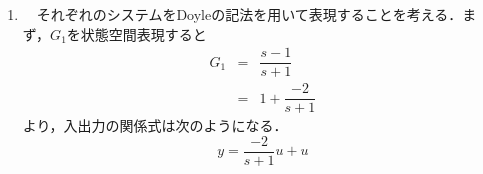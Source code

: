 \documentclass[a4paper,11pt]{jarticle}
\begin{document}
\begin{enumerate}
\begin{eqnarray*}
\begin{array}{c}
						       - \frac{1}{b} \\
						      \end{array}
						      \right] \nonumber \\
      &   & ~~~~ + \dfrac{1}{(s-a)^2 +b^2} ~ [~1 ~~ 0~] \left[
						     \begin{array}{cc}
						      s-a & b \\
						      -b & s-a \\
						     \end{array}
						    \right] \left[
						    \begin{array}{c}
						     1 \\
						     0 \\
						    \end{array}
							    \right] \cdot \dfrac{1}{s-a}\\
      & = & \dfrac{1}{(s-a)^2 + b^2} ~ [~ s-a ~~~ b ~] \left[
						\begin{array}{c}
						 0 \\
						 \ \frac{1}{b} \\
						\end{array}
						\right] + \dfrac{1}{(s-a)^2 +b^2} ~ [~s-a ~~~ b~] \left[
											     \begin{array}{c}
											      1 \\
											      0 \\
											     \end{array}
											     \right] \cdot \dfrac{1}{s-a}\\
      & = & \dfrac{1}{(s-a)^2 + b^2} ~ \cdot (-1) + \dfrac{1}{(s-a)^2 + b^2}\\\\
      & = & 0
\end{eqnarray*}
となる．よって入力信号が印加されても，出力信号は$ 0 $となり，入力は出力から遮断されていることが分かる．
 \item \ \ それぞれのシステムをDoyleの記法を用いて表現することを考える．まず，$ G_1 $を状態空間表現すると
       \begin{eqnarray*}
	G_1 & = & \dfrac{s-1}{s+1}\\
	    & = & 1 + \dfrac{-2}{s+1}
       \end{eqnarray*}
       より，入出力の関係式は次のようになる．
       \begin{equation}
	y = \dfrac{-2}{s+1}u + u
       \end{equation}

\end{enumerate}
\end{document}
